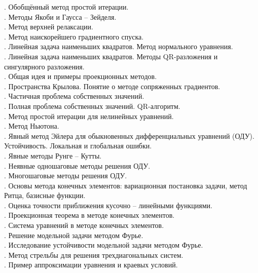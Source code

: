 \documentclass[specialist, subf, href, colorlinks=true, 14pt, times, mtpro, final]{disser}
\begin{document}
{. Обобщённый метод простой итерации.\\
. Методы Якоби и Гаусса -- Зейделя.\\
. Метод верхней релаксации.\\
. Метод наискорейшего градиентного спуска.\\
. Линейная задача наименьших квадратов. Метод нормального уравнения.\\
. Линейная задача наименьших квадратов. Методы QR-разложения и сингулярного разложения.\\
. Общая идея и примеры проекционных методов.\\
. Пространства Крылова. Понятие о методе сопряженных градиентов.\\
. Частичная проблема собственных значений.\\
. Полная проблема собственных значений. QR-алгоритм.\\
. Метод простой итерации для нелинейных уравнений.\\
. Метод Ньютона.\\
. Явный метод Эйлера для обыкновенных дифференциальных уравнений (ОДУ). Устойчивость. Локальная и глобальная ошибки.\\
. Явные методы Рунге -- Кутты.\\
. Неявные одношаговые методы решения ОДУ.\\
. Многошаговые методы решения ОДУ.\\
. Основы метода конечных элементов: вариационная постановка задачи, метод Ритца, базисные функции.\\
. Оценка точности приближения кусочно -- линейными функциями.\\
. Проекционная теорема в методе конечных элементов.\\
. Система уравнений в методе конечных элементов.\\
. Решение модельной задачи методом Фурье.\\
. Исследование устойчивости модельной задачи методом Фурье.\\
. Метод стрельбы для решения трехдиагональных систем.\\
. Пример аппроксимации уравнения и краевых условий.\\
}
\end{document}

